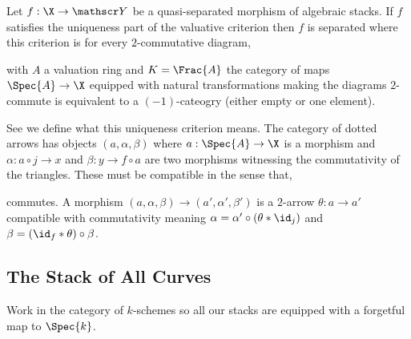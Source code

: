 \documentclass[12pt]{article}
\begin{document}
\begin{prop}
Let $f : \X \to \Y$ be a quasi-separated morphism of algebraic stacks. If $f$ satisfies the uniqueness part of the valuative criterion then $f$ is separated where this criterion is for every $2$-commutative diagram,
\begin{center}
\end{center}
with $A$ a valuation ring and $K = \Frac{A}$ the category of maps $\Spec{A} \to \X$ equipped with natural transformations making the diagrams $2$-commute is equivalent to a $(-1)$-cateogry (either empty or one element).
\end{prop}

\begin{rmk}
See  we define what this uniqueness criterion means. The category of dotted arrows has objects $(a, \alpha, \beta)$ where $a : \Spec{A} \to \X$ is a morphism and $\alpha : a \circ j \to x$ and $\beta : y \to f \circ a$ are two morphisms witnessing the commutativity of the triangles. These must be compatible in the sense that,
\begin{center}
\end{center}
commutes. A morphism $(a, \alpha, \beta) \to (a', \alpha', \beta')$ is a $2$-arrow $\theta : a \to a'$ compatible with commutativity meaning $\alpha = \alpha' \circ (\theta * \id_j)$ and $\beta = (\id_f * \theta) \circ \beta$. 
\end{rmk}

\subsection{The Stack of All Curves}

\newcommand{\Mall}{\mathcal{M}^{\text{all}}}

\begin{rmk}
Work in the category of $k$-schemes so all our stacks are equipped with a forgetful map to $\Spec{k}$. 
\end{rmk}
\end{document}

